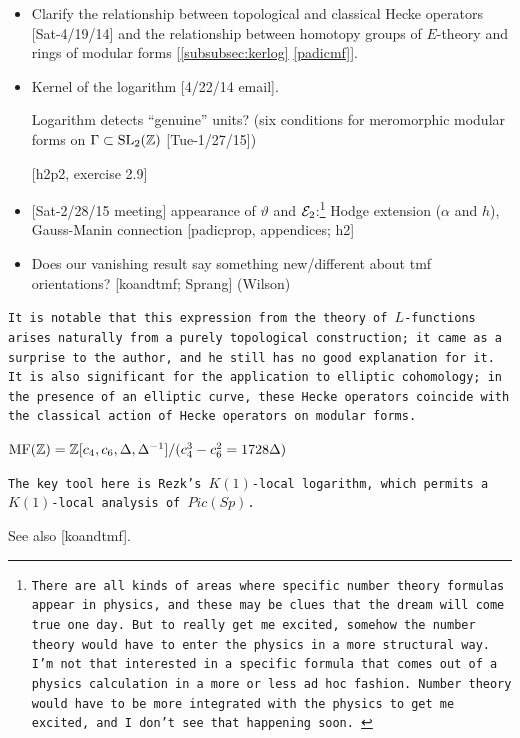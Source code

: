 \documentclass{rs}
\theoremstyle{definition}
\theoremstyle{remark}
\newcommand{\mb}[1]{\mathbb{#1}}
\newcommand{\CE}{{\cal E}}
\newcommand{\BZ}{{\mb Z}}
\newcommand{\MF}{{\rm MF}}
\newcommand{\A}{\alpha}
\newcommand{\G}{\Gamma}
\renewcommand{\=}{\approx}
\renewcommand{\-}{\sim}
\newcommand{\SL}{{\rm SL}}
\numberwithin{equation}{section}
\numberwithin{thm}{section}
\begin{document}
\begin{itemize}
 \item Clarify the relationship between topological and classical Hecke operators [Sat-4/19/14] 
 and the relationship between homotopy groups of $E$-theory and rings of modular forms [\ref{subsubsec:kerlog} \eqref{padicmf}].  

 \item Kernel of the logarithm [4/22/14 email].  

 Logarithm detects ``genuine'' units?  (six conditions for meromorphic modular forms on $\G \subset \SL_2(\BZ)$ [Tue-1/27/15]) 

 [h2p2, exercise 2.9] 

 \item {[Sat-2/28/15 meeting]} appearance of $\vartheta$ and $\CE_2$:\footnote{\texttt{There are all kinds of areas where specific number theory formulas appear in physics, 
 and these may be clues that the dream will come true one day.  
 But to really get me excited, somehow the number theory would have to enter the physics in a more structural way.  
 I'm not that interested in a specific formula that comes out of a physics calculation in a more or less ad hoc fashion.  
 Number theory would have to be more integrated with the physics to get me excited, 
 and I don't see that happening soon.  }} Hodge extension ($\A$ and $h$), Gauss-Manin connection [padicprop, appendices; h2] 

 \item Does our vanishing result say something new/different about tmf orientations?  [koandtmf; Sprang] (Wilson) 
\end{itemize}


\texttt{It is notable that this expression from the theory of $L$-functions arises naturally from a purely topological construction; 
it came as a surprise to the author, 
and he still has no good explanation for it.  
It is also significant for the application to elliptic cohomology; 
in the presence of an elliptic curve, 
these Hecke operators coincide with the classical action of Hecke operators on modular forms.  }

$\MF(\BZ) = \BZ [c_4, c_6, \Delta, \Delta^{-1}] / (c_4^3 - c_6^2 = 1728 \Delta)$ 

\texttt{The key tool here is Rezk's $K(1)$-local logarithm, which permits a $K(1)$-local analysis of $Pic(Sp)$.  }

See also [koandtmf].  
\end{document}
